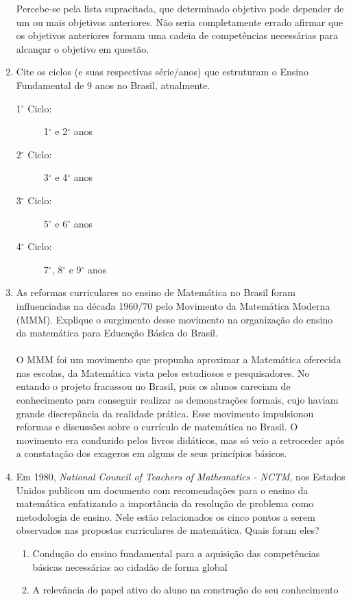 \documentclass[a4paper, 12pt]{article}
\begin{document}
\begin{enumerate}
\begin{itemize}
  \end{itemize}
  Percebe-se pela lista supracitada, que determinado objetivo pode depender de um ou mais objetivos anteriores. Não seria completamente errado afirmar que os objetivos anteriores formam uma cadeia de competências necessárias para alcançar o objetivo em questão.
\item Cite os ciclos (e suas respectivas série/anos) que estruturam o Ensino Fundamental de 9 anos no Brasil, atualmente.
  \begin{description}
  \item[1$^{\circ}$ Ciclo:] 1$^{\circ}$ e 2$^{\circ}$ anos
  \item[2$^{\circ}$ Ciclo:] 3$^{\circ}$ e 4$^{\circ}$ anos
  \item[3$^{\circ}$ Ciclo:] 5$^{\circ}$ e 6$^{\circ}$ anos
  \item[4$^{\circ}$ Ciclo:] 7$^{\circ}$, 8$^{\circ}$ e 9$^{\circ}$ anos
  \end{description}
\item As reformas curriculares no ensino de Matemática no Brasil foram influenciadas na década 1960/70 pelo Movimento da Matemática Moderna (MMM). Explique o surgimento desse movimento na organização do ensino da matemática para Educação Básica do Brasil. \\ \\
 O MMM foi um movimento que propunha aproximar a Matemática oferecida nas escolas, da Matemática vista pelos estudiosos e pesquisadores. No entando o projeto fracassou no Brasil, pois os alunos careciam de conhecimento para conseguir realizar as demonstrações formais, cujo haviam grande discrepância da realidade prática. Esse movimento impulsionou reformas e discussões sobre o currículo de matemática no Brasil. O movimento era conduzido pelos livros didáticos, mas só veio a retroceder após a constatação dos exageros em alguns de seus princípios básicos.
\item Em 1980, \textit{National Council of Teachers of Mathematics - NCTM}, nos Estados Unidos publicou um documento com recomendações para o ensino da matemática enfatizando a importância da resolução de problema como metodologia de ensino. Nele estão relacionados os cinco pontos a serem observados nas propostas curriculares de matemática. Quais foram eles?
  \begin{enumerate}
  \item Condução do ensino fundamental para a aquisição das competências básicas necessárias ao cidadão de forma global
  \item A relevância do papel ativo do aluno na construção do seu conhecimento

\end{enumerate}
\end{enumerate}
\end{document}
